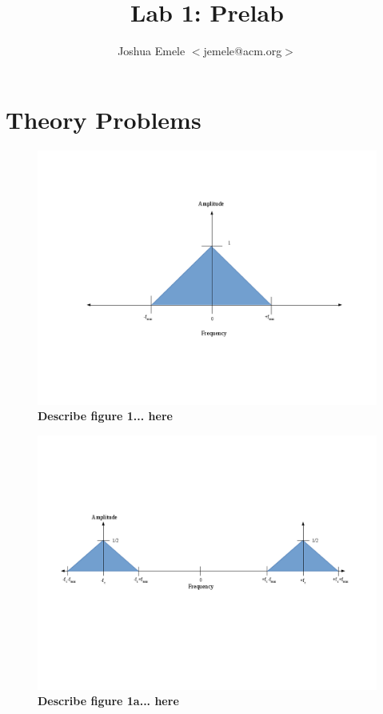 \documentclass[letterpaper,12pt]{article}
\begin{document}
\title{Lab 1: Prelab}
\author{Joshua Emele $<$jemele@acm.org$>$}
\maketitle

\section{Theory Problems}

\begin{figure}[ht] 
\includegraphics[width=1.0\columnwidth]{prelab1-figure1}
\caption{
\label{fig:hw1-figure1}
{\bf Describe figure 1...
here}
}
\end{figure}

\begin{figure}[ht] 
\includegraphics[width=1.0\columnwidth]{prelab1-figure1a}
\caption{
\label{fig:hw1-figure1a}
{\bf Describe figure 1a...
here}
}
\end{figure}
\end{document}
